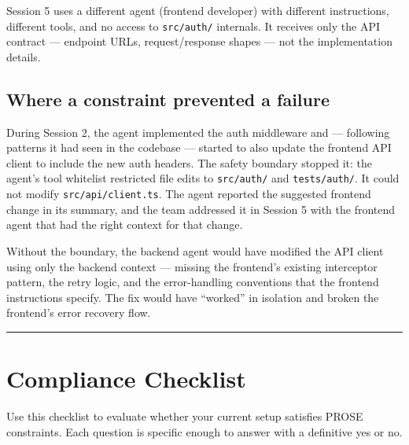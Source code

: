 \documentclass[
  a4paper,
  DIV=11,
  numbers=noendperiod]{scrreprt}
\begin{document}
Session 5 uses a different agent (frontend developer) with different
instructions, different tools, and no access to \texttt{src/auth/}
internals. It receives only the API contract --- endpoint URLs,
request/response shapes --- not the implementation details.

\subsection{Where a constraint prevented a
failure}\label{where-a-constraint-prevented-a-failure}

During Session 2, the agent implemented the auth middleware and ---
following patterns it had seen in the codebase --- started to also
update the frontend API client to include the new auth headers. The
safety boundary stopped it: the agent's tool whitelist restricted file
edits to \texttt{src/auth/} and \texttt{tests/auth/}. It could not
modify \texttt{src/api/client.ts}. The agent reported the suggested
frontend change in its summary, and the team addressed it in Session 5
with the frontend agent that had the right context for that change.

Without the boundary, the backend agent would have modified the API
client using only the backend context --- missing the frontend's
existing interceptor pattern, the retry logic, and the error-handling
conventions that the frontend instructions specify. The fix would have
``worked'' in isolation and broken the frontend's error recovery flow.

\begin{center}\rule{0.5\linewidth}{0.5pt}\end{center}

\section{Compliance Checklist}\label{compliance-checklist}

Use this checklist to evaluate whether your current setup satisfies
PROSE constraints. Each question is specific enough to answer with a
definitive yes or no.
\end{document}
